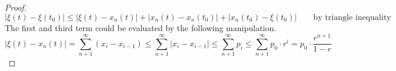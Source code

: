\documentclass[a4paper,10pt]{article}
\begin{document}
\begin{proof}
        \begin{displaymath}
            |\xi(t) - \xi(t_0)| \leq |\xi(t) - x_n(t)| + |x_n(t) - x_n(t_0)| + |x_n(t_0) - \xi(t_0)| \qquad \text{by triangle inequality} 
        \end{displaymath}
        The first and third term could be evaluated by the following manipulation.
        \begin{displaymath}
            |\xi(t) - x_n(t)| = \sum_{n+1}^{\infty} (x_i - x_{i-1}) \leq \sum_{n+1}^{\infty} |x_i - x_{i-1}| \leq \sum_{n+1}^{\infty} p_i \leq \sum_{n+1}^{\infty} p_0 \cdot r^{i} = p_0 \cdot \frac{r^{n+1}}{1-r}
        \end{displaymath}
        

    \end{proof} 
    
\end{document}
